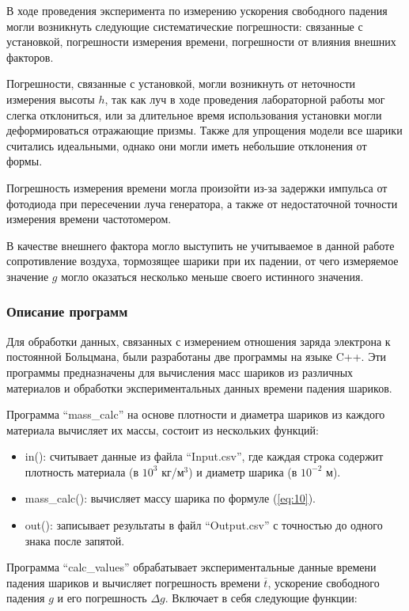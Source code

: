 В ходе проведения эксперимента по измерению ускорения свободного падения могли возникнуть следующие систематические погрешности: связанные с установкой, погрешности измерения времени, погрешности от влияния внешних факторов.

Погрешности, связанные с установкой, могли возникнуть от неточности измерения высоты $h$, так как луч в ходе проведения лабораторной работы мог слегка отклониться, или за длительное время использования установки могли деформироваться отражающие призмы. Также для упрощения модели все шарики считались идеальными, однако они могли иметь небольшие отклонения от формы.

Погрешность измерения времени могла произойти из-за задержки импульса от фотодиода при пересечении луча генератора, а также от недостаточной точности измерения времени частотомером.

В качестве внешнего фактора могло выступить не учитываемое в данной работе сопротивление воздуха, тормозящее шарики при их падении, от чего измеряемое значение $g$ могло оказаться несколько меньше своего истинного значения.


\subsubsection{Описание программ}

Для обработки данных, связанных с измерением отношения заряда электрона к постоянной Больцмана, были разработаны две программы на языке C++. Эти программы предназначены для вычисления масс шариков из различных материалов и обработки экспериментальных данных времени падения шариков.

Программа ``mass\_calc'' на основе плотности и диаметра шариков из каждого материала вычисляет их массы, состоит из нескольких функций:
\begin{itemize}
\item in(): считывает данные из файла ``Input.csv'', где каждая строка содержит плотность материала (в $10^3$ кг/м$^3$) и диаметр шарика (в $10^{-2}$ м).
\item mass\_calc(): вычисляет массу шарика по формуле (\ref{eq:10}).
\item out(): записывает результаты в файл ``Output.csv'' с точностью до одного знака после запятой.
\end{itemize}

Программа ``calc\_values'' обрабатывает экспериментальные данные времени падения шариков и вычисляет погрешность времени $\overline{t}$, ускорение свободного падения $g$ и его погрешность $\Delta g$. Включает в себя следующие функции:

